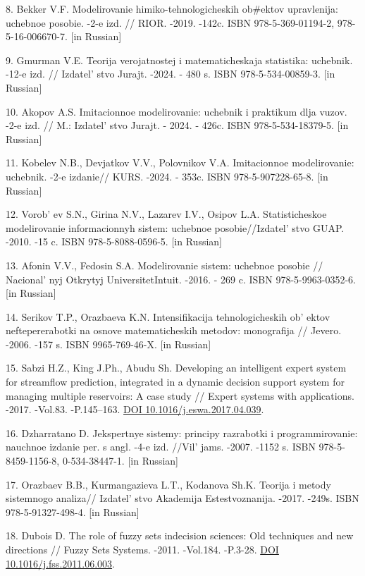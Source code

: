\begin{refs}
8. Bekker V.F. Modelirovanie himiko-tehnologicheskih ob\#ektov
upravlenija: uchebnoe posobie. -2-e izd. // RIOR. -2019. -142c. ISBN
978-5-369-01194-2, 978-5-16-006670-7. {[}in Russian{]}

9. Gmurman V.E. Teorija verojatnostej i matematicheskaja statistika:
uchebnik. -12-e izd. // Izdatel' stvo Jurajt. -2024. -
480 s. ISBN 978-5-534-00859-3. {[}in Russian{]}

10. Akopov A.S. Imitacionnoe modelirovanie: uchebnik i praktikum dlja
vuzov. -2-e izd. // M.: Izdatel' stvo Jurajt. - 2024. -
426c. ISBN 978-5-534-18379-5. {[}in Russian{]}

11. Kobelev N.B., Devjatkov V.V., Polovnikov V.A. Imitacionnoe
modelirovanie: uchebnik. -2-e izdanie// KURS. -2024. - 353c. ISBN
978-5-907228-65-8. {[}in Russian{]}

12. Vorob' ev S.N., Girina N.V., Lazarev I.V., Osipov
L.A. Statisticheskoe modelirovanie informacionnyh sistem: uchebnoe
posobie//Izdatel' stvo GUAP. -2010. -15 c. ISBN
978-5-8088-0596-5. {[}in Russian{]}

13. Afonin V.V., Fedosin S.A. Modelirovanie sistem: uchebnoe posobie //
Nacional' nyj Otkrytyj UniversitetIntuit. -2016. - 269 c.
ISBN 978-5-9963-0352-6. {[}in Russian{]}

14. Serikov T.P., Orazbaeva K.N. Intensifikacija tehnologicheskih
ob' ektov neftepererabotki na osnove matematicheskih
metodov: monografija // Jevero. -2006. -157 s. ISBN 9965-769-46-X. {[}in
Russian{]}

15. Sabzi H.Z., King J.Ph., Abudu Sh. Developing an intelligent expert
system for streamflow prediction, integrated in a dynamic decision
support system for managing multiple reservoirs: A case study // Expert
systems with applications. -2017. -Vol.83. -P.145--163.
\href{https://doi.org/10.1016/j.eswa.2017.04.039}{DOI
10.1016/j.eswa.2017.04.039}.

16. Dzharratano D. Jekspertnye sistemy: principy razrabotki i
programmirovanie: nauchnoe izdanie per. s angl. -4-e izd.
//Vil' jams. -2007. -1152 s. ISBN 978-5-8459-1156-8,
0-534-38447-1. {[}in Russian{]}

17. Orazbaev B.B., Kurmangazieva L.T., Kodanova Sh.K. Teorija i metody
sistemnogo analiza// Izdatel' stvo Akademija
Estestvoznanija. -2017. -249s. ISBN 978-5-91327-498-4. {[}in Russian{]}

18. Dubois D. The role of fuzzy sets indecision sciences: Old techniques
and new directions // Fuzzy Sets Systems. -2011. -Vol.184. -P.3-28.
\href{https://doi.org/10.1016/j.fss.2011.06.003}{DOI
10.1016/j.fss.2011.06.003}.


\end{refs}

